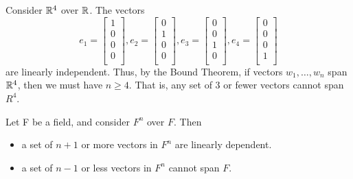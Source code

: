 \documentclass{article}
\begin{document}
  \begin{example}
    Consider $\mathbb{R}^4$ over $\mathbb{R}$. The vectors
    \[
      e_1 =
      \begin{bmatrix}
        1\\0\\0\\0\\
      \end{bmatrix}, e_2 =
      \begin{bmatrix}
        0\\1\\0\\0\\
      \end{bmatrix}, e_3 =
      \begin{bmatrix}
        0\\0\\1\\0\\
      \end{bmatrix}, e_4 =
      \begin{bmatrix}
        0\\0\\0\\1\\
      \end{bmatrix}
    \]
    are linearly independent. Thus, by the Bound Theorem, if vectors $w_1, \ldots, w_n$ span $\mathbb{R}^4$, then we must have $n \geq 4$. That is, any set of $3$ or fewer vectors cannot span $R^4$.
  \end{example}
  \begin{theorem}
    Let F be a field, and consider $F^n$ over $F$. Then
    \begin{itemize}
      \item a set of $n+1$ or more vectors in $F^n$ are linearly dependent.
      \item a set of $n-1$ or less vectors in $F^n$ cannot span $F$.
    \end{itemize}
  \end{theorem}
\end{document}
